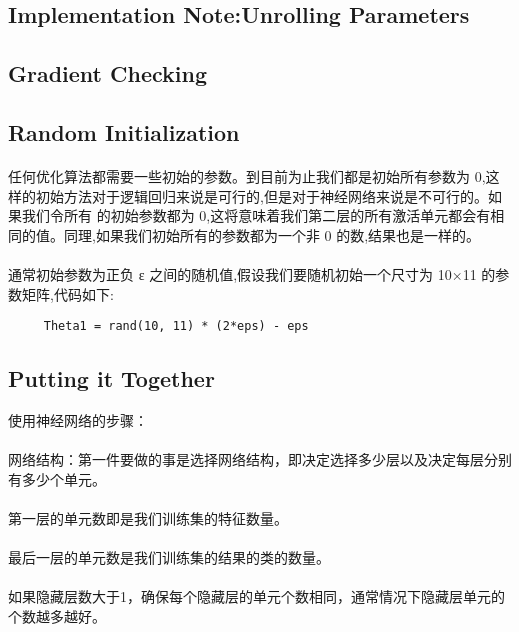 \documentclass{article}
\begin{document}
\begin{CJK}{UTF8}{gbsn}
\subsection{Implementation Note:Unrolling Parameters}
\subsection{Gradient Checking}
\subsection{Random Initialization}
\paragraph{ }
任何优化算法都需要一些初始的参数。到目前为止我们都是初始所有参数为 0,这样的初始方法对于逻辑回归来说是可行的,但是对于神经网络来说是不可行的。如果我们令所有
的初始参数都为 0,这将意味着我们第二层的所有激活单元都会有相同的值。同理,如果我们初始所有的参数都为一个非 0 的数,结果也是一样的。
\paragraph{}
通常初始参数为正负 ε 之间的随机值,假设我们要随机初始一个尺寸为 10×11 的参数矩阵,代码如下:
    \begin{verbatim}
     Theta1 = rand(10, 11) * (2*eps) - eps
    \end{verbatim}
\subsection{Putting it Together}
使用神经网络的步骤：
\paragraph{}
网络结构：第一件要做的事是选择网络结构，即决定选择多少层以及决定每层分别有多少个单元。
\paragraph{}
第一层的单元数即是我们训练集的特征数量。
\paragraph{}
最后一层的单元数是我们训练集的结果的类的数量。
\paragraph{}
如果隐藏层数大于1，确保每个隐藏层的单元个数相同，通常情况下隐藏层单元的个数越多越好。

\end{CJK}
\end{document}
